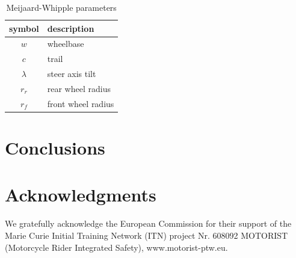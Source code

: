 \documentclass[11pt,a4paper,reqno]{amsart}
\begin{document}
\begin{table}
    \centering
    \begin{tabular}{|c|l|}
        \hline
        symbol & description \\
        \hline
        $ w $ & wheelbase \\
        $ c $ & trail \\
        $ \lambda $ & steer axis tilt \\
        $ r_r $ & rear wheel radius \\
        $ r_f $ & front wheel radius \\
        \hline
    \end{tabular}
    \caption{Meijaard-Whipple parameters}
    \label{tab:parameters}
\end{table}

\section{Conclusions}

\section{Acknowledgments}
We gratefully acknowledge the European Commission for their support of the Marie Curie Initial Training Network (ITN)
project Nr. 608092 MOTORIST (Motorcycle Rider Integrated Safety), www.motorist-ptw.eu.



\end{document}
